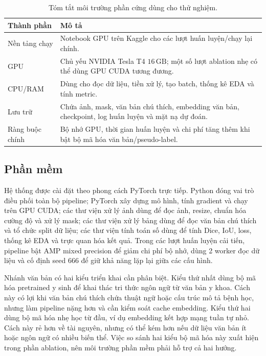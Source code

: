 \begin{table}[H]
  \centering
  \caption{Tóm tắt môi trường phần cứng dùng cho thử nghiệm.}
  \label{tab:hardware-env}
  \small
  \renewcommand{\arraystretch}{1.12}
  \setlength{\tabcolsep}{5pt}
  \begin{tabularx}{\textwidth}{@{}p{} X@{}}
    \toprule
    Thành phần & Mô tả \\
    \midrule
    Nền tảng chạy & Notebook GPU trên Kaggle cho các lượt huấn luyện/chạy lại chính. \\
    GPU & Chủ yếu NVIDIA Tesla T4 \(16\,\mathrm{GB}\); một số lượt ablation nhẹ có thể dùng GPU CUDA tương đương. \\
    CPU/RAM & Dùng cho đọc dữ liệu, tiền xử lý, tạo batch, thống kê EDA và tính metric. \\
    Lưu trữ & Chứa ảnh, mask, văn bản chú thích, embedding văn bản, checkpoint, log huấn luyện và mặt nạ dự đoán. \\
    Ràng buộc chính & Bộ nhớ GPU, thời gian huấn luyện và chi phí tăng thêm khi bật bộ mã hóa văn bản/pseudo-label. \\
    \bottomrule
  \end{tabularx}
\end{table}
\FloatBarrier

\subsection{Phần mềm}

Hệ thống được cài đặt theo phong cách PyTorch trực tiếp. Python đóng vai trò điều phối toàn bộ pipeline; PyTorch xây dựng mô hình, tính gradient và chạy trên GPU CUDA; các thư viện xử lý ảnh dùng để đọc ảnh, resize, chuẩn hóa cường độ và xử lý mask; các thư viện xử lý bảng dùng để đọc văn bản chú thích và tổ chức split dữ liệu; các thư viện tính toán số dùng để tính Dice, IoU, loss, thống kê EDA và trực quan hóa kết quả. Trong các lượt huấn luyện cải tiến, pipeline bật AMP mixed precision để giảm chi phí bộ nhớ, dùng 2 worker đọc dữ liệu và cố định seed 666 để giữ khả năng lặp lại giữa các cấu hình.

Nhánh văn bản có hai kiểu triển khai cần phân biệt. Kiểu thứ nhất dùng bộ mã hóa pretrained y sinh để khai thác tri thức ngôn ngữ từ văn bản y khoa. Cách này có lợi khi văn bản chú thích chứa thuật ngữ hoặc cấu trúc mô tả bệnh học, nhưng làm pipeline nặng hơn và cần kiểm soát cache embedding. Kiểu thứ hai dùng bộ mã hóa nhẹ học từ đầu, ví dụ embedding kết hợp mạng tuần tự nhỏ. Cách này rẻ hơn về tài nguyên, nhưng có thể kém hơn nếu dữ liệu văn bản ít hoặc ngôn ngữ có nhiều biến thể. Việc so sánh hai kiểu bộ mã hóa này xuất hiện trong phần ablation, nên môi trường phần mềm phải hỗ trợ cả hai hướng.

